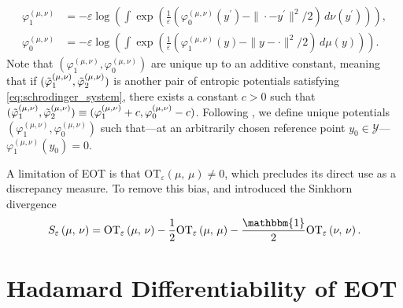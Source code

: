 \documentclass{article}
\theoremstyle{plain}
\theoremstyle{definition}
\theoremstyle{remark}
\newcommand{\of}[1]{\left(#1\right)}
\newcommand{\cY}{\mathcal{Y}}
\newcommand{\1}{\mathbbm{1}}
\newcommand{\SinkDiv}[2]{{S}_\eps\of{#1,\, #2}}
\newcommand{\EntOT}[2]{\text{OT}_\eps\of{#1,\, #2}}
\newcommand{\eps}{\varepsilon}
\theoremstyle{plain}
\theoremstyle{definition}
\begin{document}
\begin{align}\label{eq:schrodinger_system}
    \varphi_1^{(\mu, \nu)} &= -\eps \log \of{\int \exp\of{\frac{1}{\eps} \of{\varphi_0^{(\mu, \nu)}(y^\prime) - \|\cdot- y^\prime\|^2/2} \, d\nu(y^\prime)}}, \nonumber\\
    \varphi_0^{(\mu, \nu)} &= -\eps \log \of{\int \exp\of{\frac{1}{\eps} \of{\varphi_1^{(\mu, \nu)}(y) - \|y - \cdot\|^2/2} \, d\mu(y)}}.
\end{align}
Note that $(\varphi_1^{(\mu, \nu)}, \varphi_0^{(\mu, \nu)})$ are unique up to an additive constant, meaning that if $(\Tilde{\varphi}_1^{(\mu, \nu)}, \Tilde{\varphi}_2^{(\mu, \nu)})$ is another pair of entropic potentials satisfying \eqref{eq:schrodinger_system}, there exists a constant $c > 0$ such that $(\Tilde{\varphi}_1^{(\mu, \nu)}, \Tilde{\varphi}_2^{(\mu, \nu)}) \equiv (\varphi_1^{(\mu, \nu)}+c, \varphi_0^{(\mu, \nu)}-c)$. Following \citet{luise2019sinkhorn}, we define unique potentials $(\varphi_1^{(\mu, \nu)}, \varphi_0^{(\mu, \nu)})$ such that---at an arbitrarily chosen reference point $ y_0 \in \cY $---$\varphi_1^{(\mu, \nu)}(y_0) = 0$.

A limitation of EOT is that $\EntOT{\mu}{\mu} \neq 0$, which precludes its direct use as a discrepancy measure. To remove this bias, \citet{ramdas2015wasserstein} and \citet{feydy2019interpolating} introduced the Sinkhorn divergence
\[
\SinkDiv{\mu}{\nu} = \EntOT{\mu}{\nu} -\frac{1}{2}\EntOT{\mu}{\mu} - \frac{\1}{2} \EntOT{\nu}{\nu}.
\]

\section{Hadamard Differentiability of EOT} \label{appendix:Hadamard_EOT}
\end{document}
